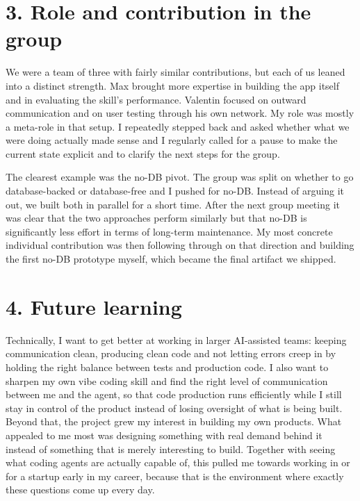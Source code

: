 \documentclass[11pt,a4paper]{article}
\begin{document}
\section*{3. Role and contribution in the group}

We were a team of three with fairly similar contributions, but each of us
leaned into a distinct strength. Max brought more expertise in building the app
itself and in evaluating the skill's performance. Valentin focused on outward
communication and on user testing through his own network. My role was mostly a
meta-role in that setup. I repeatedly stepped back and asked whether what we
were doing actually made sense and I regularly called for a pause to make the
current state explicit and to clarify the next steps for the group.

The clearest example was the no-DB pivot. The group was split on whether to go
database-backed or database-free and I pushed for no-DB. Instead of arguing it
out, we built both in parallel for a short time. After the next group meeting it
was clear that the two approaches perform similarly but that no-DB is
significantly less effort in terms of long-term maintenance. My most concrete individual contribution was then following through
on that direction and building the first no-DB prototype myself, which became
the final artifact we shipped.

\section*{4. Future learning}

Technically, I want to get better at working in larger AI-assisted teams:
keeping communication clean, producing clean code and not letting errors creep
in by holding the right balance between tests and production code. I also want
to sharpen my own vibe coding skill and find the right level of communication
between me and the agent, so that code production runs efficiently while I still
stay in control of the product instead of losing oversight of what is being
built. Beyond that, the project grew my interest in
building my own products. What appealed to me most was designing something with
real demand behind it instead of something that is merely interesting to build.
Together with seeing what coding agents are actually capable of, this pulled me
towards working in or for a startup early in my career, because that is the
environment where exactly these questions come up every day.
\end{document}
